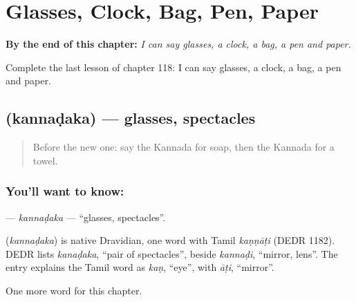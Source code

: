
\chapter{Glasses, Clock, Bag, Pen, Paper}
\label{ch:ka-glasses-clock-bag-pen-paper}

\begin{chapteropening}
\textbf{By the end of this chapter:} \emph{I can say glasses, a clock, a bag, a pen and paper.}

Complete the last lesson of chapter 118: I can say glasses, a clock, a bag, a pen and paper.
\end{chapteropening}

\section[\texorpdfstring{\kn{ಕನ್ನಡಕ} (kannaḍaka)}{ಕನ್ನಡಕ (kannaḍaka)}]{ (kannaḍaka) — glasses, spectacles}

\label{lesson:KA-C118-kannadaka}



\begin{quote}
Before the new one: say the Kannada for soap, then the Kannada for a towel.
\end{quote}

\subsection*{You'll want to know: }
\textbf{} — \emph{kannaḍaka} — \textquotedblleft{}glasses, spectacles\textquotedblright{}.

\begin{cousinweb}
\textbf{} (\emph{kannaḍaka}) is native Dravidian, one word with Tamil \emph{kaṇṇāṭi} (DEDR 1182). DEDR lists \emph{kanaḍaka}, \textquotedblleft{}pair of spectacles\textquotedblright{}, beside \emph{kannaḍi}, \textquotedblleft{}mirror, lens\textquotedblright{}. The entry explains the Tamil word as \emph{kaṇ}, \textquotedblleft{}eye\textquotedblright{}, with \emph{āṭi}, \textquotedblleft{}mirror\textquotedblright{}.
\end{cousinweb}

\begin{grammarlens}[title={What you've built}]
One more word for this chapter.
\end{grammarlens}

